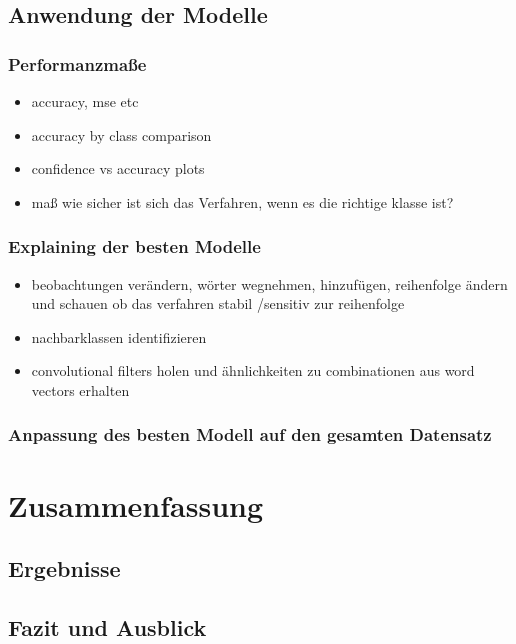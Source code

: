 \documentclass[a4paper,11pt]{article}
\begin{document}
\subsection{Anwendung der Modelle}
\subsubsection{Performanzmaße}

\begin{itemize}
    \item accuracy, mse etc
    \item accuracy by class comparison
    \item confidence vs accuracy plots
    \item maß wie sicher ist sich das Verfahren, wenn es die richtige klasse ist?
\end{itemize}{}

\subsubsection{Explaining der besten Modelle}

\begin{itemize}
    \item beobachtungen verändern, wörter wegnehmen, hinzufügen, reihenfolge ändern und schauen ob das verfahren stabil /sensitiv zur reihenfolge
    \item nachbarklassen identifizieren
    \item convolutional filters holen und ähnlichkeiten zu combinationen aus word vectors erhalten
\end{itemize}{}

\subsubsection{Anpassung des besten Modell auf den gesamten Datensatz}

\section{Zusammenfassung}

\subsection{Ergebnisse}
\subsection{Fazit und Ausblick}

\newpage

\printbibliography[
heading=bibintoc,
title={Literaturverzeichnis}
]
\end{document}
